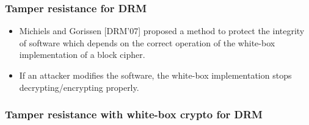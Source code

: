 \documentclass{beamer}
\begin{document}
\frame
{
\frametitle{Tamper resistance for DRM}

\begin{itemize}
\item Michiels and Gorissen [DRM'07] proposed a method to protect the integrity of software which depends on the correct operation of the white-box implementation of a block cipher.
\item If an attacker modifies the software, the white-box implementation stops decrypting/encrypting properly.
\end{itemize}

}

\frame
{
\frametitle{Tamper resistance with white-box crypto for DRM}

\begin{center}
\end{center}

}
\end{document}
